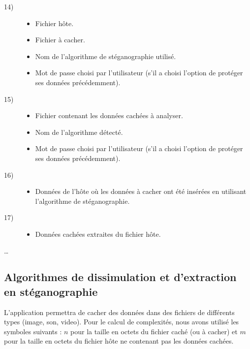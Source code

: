 \documentclass[11pt]{article}
\begin{document}
\begin{multicols}{2}
\begin{description}
\item[14)]
\begin{itemize}
\item Fichier hôte.
\item Fichier à cacher.
\item Nom de l'algorithme de stéganographie utilisé.
\item Mot de passe choisi par l'utilisateur (s'il a choisi l'option de protéger
    ses données précédemment).
\end{itemize}
\item[15)]
\begin{itemize}
\item Fichier contenant les données cachées à analyser.
\item Nom de l'algorithme détecté.
\item Mot de passe choisi par l'utilisateur (s'il a choisi l'option de protéger
    ses données précédemment).
\end{itemize}
\item[16)]
\begin{itemize}
\item Données de l'hôte où les données à cacher ont été insérées en utilisant
    l'algorithme de stéganographie.
\end{itemize}
\item[17)]
\begin{itemize}
\item Données cachées extraites du fichier hôte.
\end{itemize}
\end{description}
  \ldots
\end{multicols}

\small
\subsection{Algorithmes de dissimulation et d'extraction en stéganographie}

L'application permettra de cacher des données dans des fichiers de différents
types (image, son, video). Pour le calcul de complexités, nous avons utilisé les symboles suivants : 
$n$ pour la taille en octets du fichier caché (ou à cacher) et $m$ pour la taille 
en octets du fichier hôte ne contenant pas les données cachées. 
\end{document}
